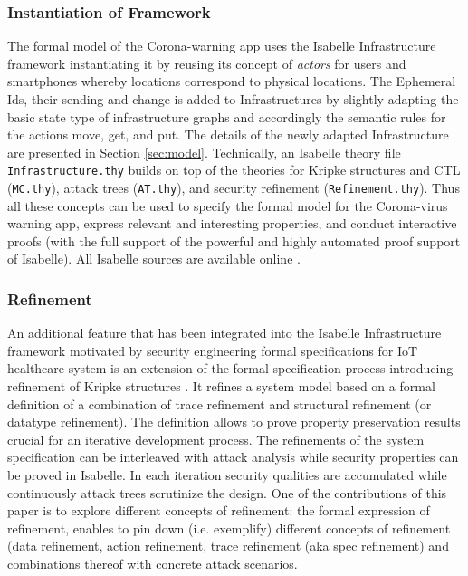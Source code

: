 \documentclass{llncs}
\begin{document}
\subsubsection{Instantiation of Framework}
The formal model of the Corona-warning app uses the Isabelle Infrastructure framework instantiating it
by reusing its concept of {\it actors} for users and smartphones whereby locations correspond
to physical locations. The Ephemeral Ids, their sending and change is added to Infrastructures
by slightly adapting the basic state type of infrastructure graphs and accordingly the semantic rules
for the actions move, get, and put. The details of the newly adapted Infrastructure are
presented in Section \ref{sec:model}.
Technically, an Isabelle theory file \texttt{Infrastructure.thy} builds on top of the theories for Kripke 
structures and CTL (\texttt{MC.thy}), attack trees (\texttt{AT.thy}), and security refinement 
(\texttt{Refinement.thy}). Thus all these concepts can be used to specify the formal model
for the Corona-virus warning app, express relevant and interesting properties, and conduct
interactive proofs (with the full support of the powerful and highly automated proof support
of Isabelle).
All Isabelle sources are available online \cite{kam:20gitsc}.

\subsubsection{Refinement}
An additional feature that has been integrated into the Isabelle Infrastructure
framework motivated by security engineering formal specifications for IoT healthcare
system is an extension of the formal specification process introducing
refinement of Kripke structures \cite{kam:19a,kam:20a}. It refines a system model based on a 
formal definition of a combination of trace refinement and structural 
refinement (or datatype refinement). The definition allows to prove property preservation results 
crucial for an iterative development process.
The refinements of the system specification  can be interleaved with attack 
analysis while security properties can be proved in Isabelle. In each iteration
security qualities are accumulated while continuously attack trees scrutinize
the design.
One of the contributions of this paper is to explore different concepts of refinement:
the formal expression of refinement, enables to pin down (i.e. exemplify) different concepts
of refinement (data refinement, action refinement, trace refinement (aka spec refinement) and
combinations thereof with concrete attack scenarios. 
\end{document}
